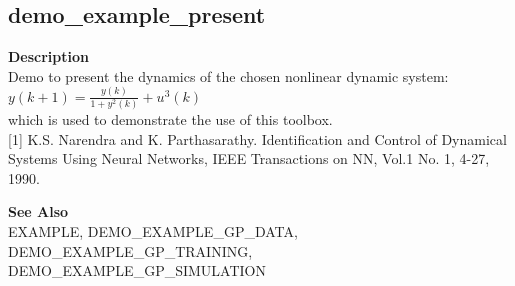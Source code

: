 \subsection*{demo\_example\_present} \label{fun:demo_example_present}


\textbf{Description}
\\ Demo to present the dynamics of the chosen nonlinear dynamic system:
\\   $ y(k+1) = \frac{y(k)}{1+y^2(k)} + u^3(k) $
\\ which is used to demonstrate the use of this toolbox.
\\
 {[}1{]} K.S. Narendra and K. Parthasarathy. Identification
 and Control of Dynamical Systems Using Neural Networks,
 IEEE Transactions on NN, Vol.1 No. 1, 4-27, 1990.

\textbf{See Also}
\\ EXAMPLE, DEMO\_EXAMPLE\_GP\_DATA, DEMO\_EXAMPLE\_GP\_TRAINING,
\\ DEMO\_EXAMPLE\_GP\_SIMULATION
